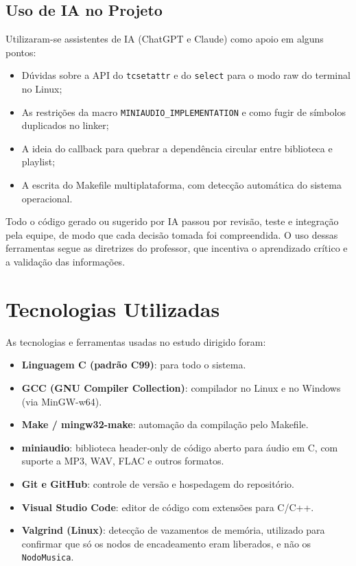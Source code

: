 \documentclass[
    12pt
    ,oneside
    ,a4paper
    ,chapter=TITLE
    ,section=TITLE
    ,sumario=abnt-6027-2012]{abntex2}
\begin{document}
\section{Uso de IA no Projeto}

Utilizaram-se assistentes de IA (ChatGPT e Claude) como apoio em alguns pontos:

\begin{itemize}
    \item Dúvidas sobre a API do \texttt{tcsetattr} e do \texttt{select} para o modo raw do terminal no Linux;
    \item As restrições da macro \texttt{MINIAUDIO\_IMPLEMENTATION} e como fugir de símbolos duplicados no linker;
    \item A ideia do callback para quebrar a dependência circular entre biblioteca e playlist;
    \item A escrita do Makefile multiplataforma, com detecção automática do sistema operacional.
\end{itemize}

Todo o código gerado ou sugerido por IA passou por revisão, teste e integração pela equipe, de modo que cada decisão tomada foi compreendida. O uso dessas ferramentas segue as diretrizes do professor, que incentiva o aprendizado crítico e a validação das informações.

\chapter{Tecnologias Utilizadas}
\label{cap:tecnologias}

As tecnologias e ferramentas usadas no estudo dirigido foram:

\begin{itemize}
    \item \textbf{Linguagem C (padrão C99)}: para todo o sistema.
    \item \textbf{GCC (GNU Compiler Collection)}: compilador no Linux e no Windows (via MinGW-w64).
    \item \textbf{Make / mingw32-make}: automação da compilação pelo Makefile.
    \item \textbf{miniaudio}: biblioteca header-only de código aberto para áudio em C, com suporte a MP3, WAV, FLAC e outros formatos.
    \item \textbf{Git e GitHub}: controle de versão e hospedagem do repositório.
    \item \textbf{Visual Studio Code}: editor de código com extensões para C/C++.
    \item \textbf{Valgrind (Linux)}: detecção de vazamentos de memória, utilizado para confirmar que só os nodos de encadeamento eram liberados, e não os \texttt{NodoMusica}.
\end{itemize}
\end{document}
